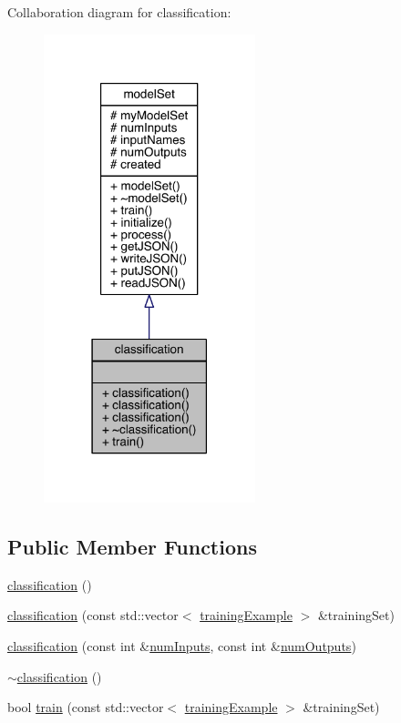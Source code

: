 Collaboration diagram for classification\+:
\nopagebreak
\begin{figure}[H]
\begin{center}
\leavevmode
\includegraphics[width=174pt]{classclassification__coll__graph}
\end{center}
\end{figure}
\subsection*{Public Member Functions}
\begin{DoxyCompactItemize}
\item 
\hyperlink{classclassification_a96cfefed3bbc9b8b61a44b9c6cc9e29a}{classification} ()
\item 
\hyperlink{classclassification_abbc5335e5c1536a0c202a79b46dc8f23}{classification} (const std\+::vector$<$ \hyperlink{structtraining_example}{training\+Example} $>$ \&training\+Set)
\item 
\hyperlink{classclassification_ab50d95013f5266aa5cc4595f69e62c71}{classification} (const int \&\hyperlink{classmodel_set_ad10fbc1228a85f1200cb89589ad92755}{num\+Inputs}, const int \&\hyperlink{classmodel_set_addc0df56b9f1970c9816050634933716}{num\+Outputs})
\item 
\hyperlink{classclassification_ac65a474682b7c3b8661585de8b8f8f8b}{$\sim$classification} ()
\item 
bool \hyperlink{classclassification_ac7f8a3ad1a0f4f466cd6f5ed041615d9}{train} (const std\+::vector$<$ \hyperlink{structtraining_example}{training\+Example} $>$ \&training\+Set)
\end{DoxyCompactItemize}
